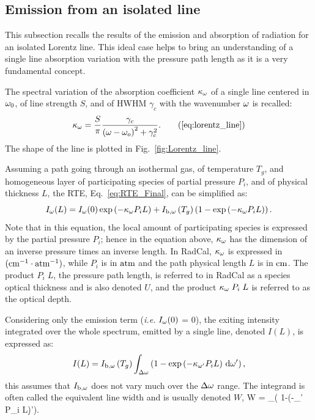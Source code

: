 \subsection{Emission from an isolated line}
This subsection recalls the results of the emission and absorption of radiation for an isolated Lorentz line. This ideal case helps to bring an understanding of a single line absorption variation with the pressure path length as it is a very fundamental concept.

The spectral variation of the absorption coefficient $\kappa_{\omega}$ of a single line centered in $\omega_0$, of line strength $S$, and of HWHM $\gamma_c$ with the wavenumber $\omega$ is recalled:
\begin{equation}
 \kappa_{\om} = \dfrac{S}{\pi}\dfrac{\gamma_c}{\left( \om - \om_o\right)^2 + \gamma_c^2}. \tag{\ref{eq:lorentz_line}}
\end{equation}
The shape of the line is plotted in Fig.~\ref{fig:Lorentz_line}.

Assuming a path going through an isothermal gas, of temperature $T_g$, and homogeneous layer of participating species of partial pressure $P_i$, and of physical thickness $L$, the RTE, Eq.~\ref{eq:RTE_Final}, can be simplified as:
\begin{equation}
 I_{\omega}(L) =  I_{\omega}(0) \exp\left( -\kappa_{\omega} P_i L\right) + I_{\rm b,\omega}\left(T_g\right) \left(1-\exp\left(-\kappa_{\omega} P_i L\right)\right).
\end{equation}
Note that in this equation, the local amount of participating species is expressed by the partial pressure $P_i$; hence in the equation above, $\kappa_{\omega}$ has the dimension of an inverse pressure times an inverse length. In RadCal, $\kappa_{\omega}$ is expressed in $\rm (cm^{-1} \cdot atm^{-1})$, while $P_i$ is in $\rm atm$ and the path physical length $L$ is in $\rm cm$. The product $P_i\;L$, the pressure path length, is referred to in RadCal as a species optical thickness and is also denoted $U$, and the product $\kappa_{\omega}\;P_i\;L$ is referred to as the optical depth.

Considering only the emission term (\textit{i.e.} $I_{\omega}(0)$ = 0), the exiting intensity integrated over the whole spectrum, emitted by a single line, denoted $I(L)$, is expressed as:
\begin{equation}
I(L) =  I_{\rm b,\omega}\left(T_g\right) \displaystyle\int_{\Delta \omega}\left( 1-\exp\left(-\kappa_{\omega'} P_i L\right)\,\mathrm{d} \omega'\right),
\end{equation}
this assumes that $I_{\rm b,\omega}$ does not vary much over the $\Delta \omega$ range. The integrand is often called the equivalent line width \cite{Modest2013} and is usually denoted $W$,
\be
W = \displaystyle\int_{\Delta \om}\left( 1-\exp\left(-\kappa_{\om'} P_i L\right)\d \om'\right).
\ee

